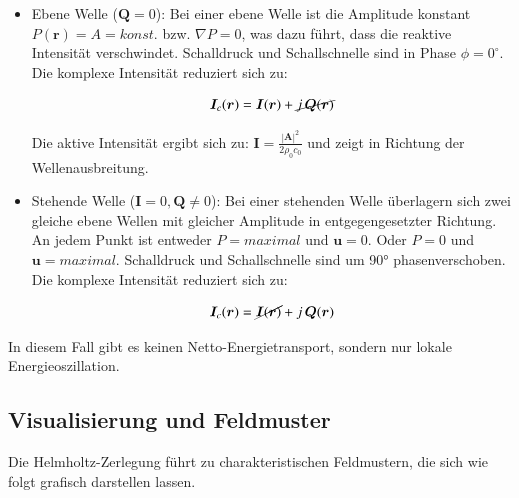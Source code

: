 \begin{itemize}


 
\item Ebene Welle ($\boldsymbol{Q} = 0$):
Bei einer ebene Welle ist die Amplitude konstant $P(\boldsymbol{r}) = A = konst.$ bzw. $\nabla P = 0$, was dazu führt, dass die reaktive Intensität verschwindet. Schalldruck und Schallschnelle sind in Phase $\phi = 0^{\circ}$. Die komplexe Intensität reduziert sich zu:
 
\begin{equation}
\boldsymbol{I}_c (\boldsymbol{r}) = \boldsymbol{I}(\boldsymbol{r}) + \cancel{j\,\boldsymbol{Q}(\boldsymbol{r})}
\end{equation}
 
Die aktive Intensität ergibt sich zu: $\boldsymbol{I} = \frac{|\boldsymbol{A}|^2}{2 \rho_0 c_0}$ und zeigt in Richtung der Wellenausbreitung.
 
\item Stehende Welle ($\boldsymbol{I} = 0, \boldsymbol{Q} \neq 0$): 
Bei einer stehenden Welle überlagern sich zwei gleiche ebene Wellen mit gleicher Amplitude in entgegengesetzter Richtung. An jedem Punkt ist entweder $P = maximal$ und $\boldsymbol{u} = 0$. Oder $P = 0$ und $\boldsymbol{u} = maximal$. Schalldruck und Schallschnelle sind um 90° phasenverschoben. Die komplexe Intensität reduziert sich zu:
 
\begin{equation}
\boldsymbol{I}_c (\boldsymbol{r}) = \cancel{\boldsymbol{I}(\boldsymbol{r})} + j\,\boldsymbol{Q}(\boldsymbol{r})
\end{equation}

\end{itemize}
In diesem Fall gibt es keinen Netto-Energietransport, sondern nur lokale Energieoszillation.


\subsection{Visualisierung und Feldmuster
\label{helmholtz:subsection:Visualisierung}}
Die Helmholtz-Zerlegung führt zu charakteristischen Feldmustern, die sich wie folgt grafisch darstellen lassen.
 
